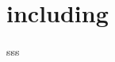 \documentclass[report]{../../custom}
\begin{document}
\maketitle

\section{including}
sss
\end{document}
